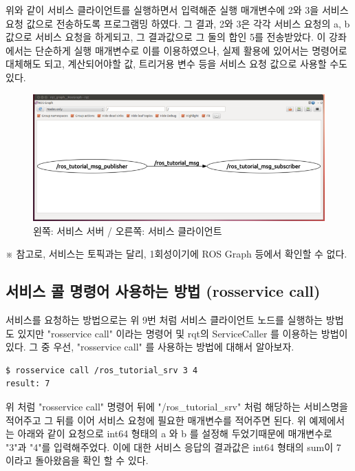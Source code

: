 위와 같이 서비스 클라이언트를 실행하면서 입력해준 실행 매개변수에 2와 3을 서비스 요청 값으로 전송하도록 프로그램밍 하였다. 그 결과, 2와 3은 각각 서비스 요청의 a, b 값으로 서비스 요청을 하게되고, 그 결과값으로 그 둘의 합인 5를 전송받았다. 이 강좌에서는 단순하게 실행 매개변수로 이를 이용하였으나, 실제 활용에 있어서는 명령어로 대체해도 되고, 계산되어야할 값, 트리거용 변수 등을 서비스 요청 값으로 사용할 수도 있다.

\begin{figure}[h]
\centering\includegraphics[width=\columnwidth]{pictures/chapter7/rqt_graph_oroca_ros_tutorials.png}
\caption{왼쪽: 서비스 서버 / 오른쪽: 서비스 클라이언트}
\end{figure}

※ 참고로, 서비스는 토픽과는 달리, 1회성이기에 ROS Graph 등에서 확인할 수 없다.

\subsection{서비스 콜 명령어 사용하는 방법 (rosservice call)}

서비스를 요청하는 방법으로는 위 9번 처럼 서비스 클라이언트 노드를 실행하는 방법도 있지만 "rosservice call" 이라는 명령어 및 rqt의 ServiceCaller 를 이용하는 방법이 있다. 그 중 우선, "rosservice call" 를 사용하는 방법에 대해서 알아보자.

\begin{lstlisting}[language=ROS]
$ rosservice call /ros_tutorial_srv 3 4
result: 7
\end{lstlisting}

위 처럼 "rosservice call" 명령어 뒤에 "/ros\_tutorial\_srv" 처럼 해당하는 서비스명을 적어주고 그 뒤를 이어 서비스 요청에 필요한 매개변수를 적어주면 된다. 위 예제에서는 아래와 같이 요청으로 int64 형태의 a 와 b 를 설정해 두었기때문에 매개변수로 "3"과 "4"를 입력해주었다. 이에 대한 서비스 응답의 결과값은 int64 형태의 sum이 7 이라고 돌아왔음을 확인 할 수 있다.  

